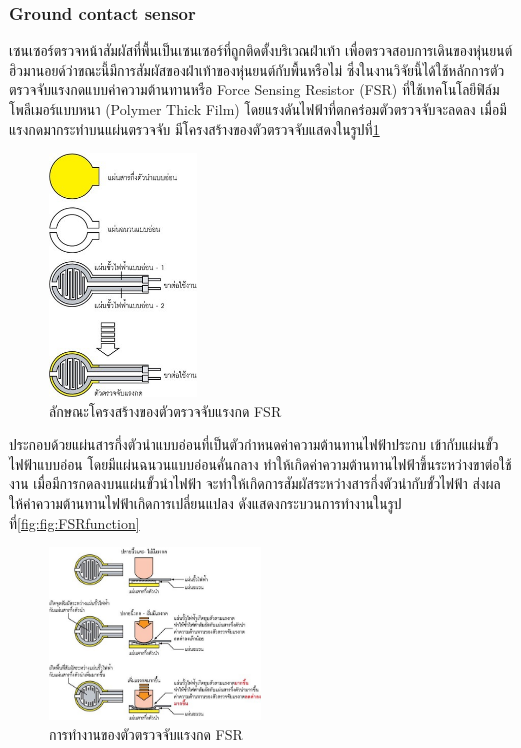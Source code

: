 {\subsubsection*{Ground contact sensor}
เซนเซอร์ตรวจหน้าสัมผัสที่พื้นเป็นเซนเซอร์ที่ถูกติดตั้งบริเวณฝ่าเท้า เพื่อตรวจสอบการเดินของหุ่นยนต์ฮิวมานอยด์ว่าขณะนี้มีการสัมผัสของฝ่าเท้าของหุ่นยนต์กับพื้นหรือไม่ 
ซึ่งในงานวิจัยนี้ได้ใช้หลักการตัวตรวจจับแรงกดแบบค่าความต้านทานหรือ Force Sensing Resistor (FSR) ที่ใช้เทคโนโลยีฟิล์มโพลีเมอร์แบบหนา (Polymer Thick Film) 
โดยแรงดันไฟฟ้าที่ตกคร่อมตัวตรวจจับจะลดลง เมื่อมีแรงกดมากระทำบนแผ่นตรวจจับ มีโครงสร้างของตัวตรวจจับแสดงในรูปที่\ref{fig:FSRarchitec}
\begin{figure}[h!]
    \centering
    \includegraphics[width=0.35\textwidth]{chapter3/images/FSRarchitec.jpg}
    \caption{ลักษณะโครงสร้างของตัวตรวจจับแรงกด FSR}
    \label{fig:FSRarchitec}
\end{figure}

ประกอบด้วยแผ่นสารกึ่งตัวนำแบบอ่อนที่เป็นตัวกำหนดค่าความต้านทานไฟฟ้าประกบ เข้ากับแผ่นขั้วไฟฟ้าแบบอ่อน โดยมีแผ่นฉนวนแบบอ่อนคั่นกลาง 
ทำให้เกิดค่าความต้านทานไฟฟ้าขึ้นระหว่างขาต่อใช้งาน เมื่อมีการกดลงบนแผ่นขั้วนำไฟฟ้า จะทำให้เกิดการสัมผัสระหว่างสารกึ่งตัวนำกับขั้วไฟฟ้า
ส่งผลให้ค่าความต้านทานไฟฟ้าเกิดการเปลี่ยนแปลง ดังแสดงกระบวนการทำงานในรูปที่\ref{fig:fig:FSRfunction}
\begin{figure}[h!]
    \centering
    \includegraphics[width=0.5\textwidth]{chapter3/images/FSRfunction.jpg}
    \caption{การทำงานของตัวตรวจจับแรงกด FSR}
    \label{fig:FSRfunction}
\end{figure}

}
